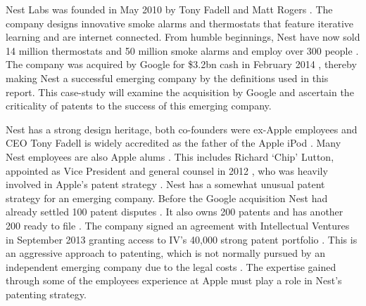 {}

Nest Labs was founded in May 2010 by Tony Fadell and Matt Rogers \cite{NestFactsheet}.
The company designs innovative smoke alarms and thermostats that feature iterative learning and are internet connected.
From humble beginnings, Nest have now sold 14 million thermostats and 50 million smoke alarms and employ over 300 people \cite{NestFactsheet}.
The company was acquired by Google for \$3.2bn cash \cite{NestReuters} in February 2014 \cite{NestFactsheet}, thereby making Nest a successful emerging company by the definitions used in this report.
This case-study will examine the acquisition by Google and ascertain the criticality of patents to the success of this emerging company.

Nest has a strong design heritage, both co-founders were ex-Apple employees and CEO Tony Fadell is widely accredited as the father of the Apple iPod \cite{NestAppleInsider}.
Many Nest employees are also Apple alums \cite{NestReuters}.
This includes Richard `Chip' Lutton, appointed as Vice President and general counsel in 2012 \cite{NestAppleInsider}, who was heavily involved in Apple's patent strategy \cite{NestReuters}.
Nest has a somewhat unusual patent strategy for an emerging company.
Before the Google acquisition Nest had already settled 100 patent disputes \cite{NestCoLabs}.
It also owns 200 patents and has another 200 ready to file \cite{NestCoLabs, NestIV}.
The company signed an agreement with Intellectual Ventures in September 2013 granting access to IV's 40,000 strong patent portfolio \cite{NestIV}.
This is an aggressive approach to patenting, which is not normally pursued by an independent emerging company due to the legal costs \cite{zahra1996technology}.
The expertise gained through some of the employees experience at Apple must play a role in Nest's patenting strategy.

